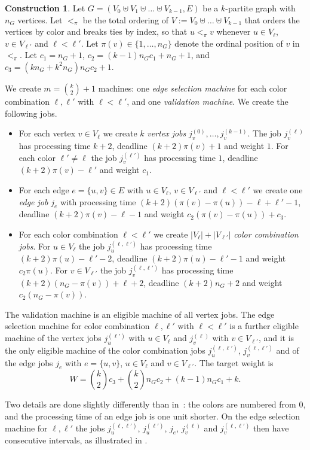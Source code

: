 \documentclass[11pt,a4paper]{article}
\theoremstyle{definition}
\newtheorem{construction}{Construction}
\begin{document}
\begin{construction}\label{const:w1hard}
Let $G=(V_0\uplus V_1\uplus\ldots\uplus V_{k-1},E)$ be a $k$-partite graph with $n_G$
vertices. Let $<_\pi$ be the total ordering of $V:=V_0\uplus\ldots\uplus V_{k-1}$ that
orders the vertices by color and breaks ties by index, so that $u<_\pi v$ whenever
$u\in V_\ell$, $v\in V_{\ell'}$ and $\ell<\ell'$. Let $\pi(v)\in\{1,\ldots,n_G\}$ denote the
ordinal position of $v$ in $<_\pi$. Let $c_1=n_G+1$, $c_2=(k-1)n_Gc_1+n_G+1$, and
$c_3=(kn_G+k^2n_G)n_Gc_2+1$.

We create $m=\binom{k}{2}+1$ machines: one \emph{edge selection machine} for each color
combination $\ell,\ell'$ with $\ell<\ell'$, and one \emph{validation machine}. We create
the following jobs.
\begin{itemize}
\item For each vertex $v\in V_\ell$ we create $k$ \emph{vertex jobs} $j_v^{(0)},\ldots,j_v^{(k-1)}$.
  The job $j_v^{(\ell)}$ has processing time $k+2$, deadline $(k+2)\pi(v)+1$ and weight $1$.
  For each color $\ell'\neq\ell$ the job $j_v^{(\ell')}$ has processing time $1$, deadline
  $(k+2)\pi(v)-\ell'$ and weight $c_1$.
\item For each edge $e=\{u,v\}\in E$ with $u\in V_\ell$, $v\in V_{\ell'}$ and $\ell<\ell'$ we
  create one \emph{edge job} $j_e$ with processing time $(k+2)(\pi(v)-\pi(u))-\ell+\ell'-1$,
  deadline $(k+2)\pi(v)-\ell-1$ and weight $c_2(\pi(v)-\pi(u))+c_3$.
\item For each color combination $\ell<\ell'$ we create $|V_\ell|+|V_{\ell'}|$ \emph{color
  combination jobs}. For $u\in V_\ell$ the job $j_u^{(\ell,\ell')}$ has processing time
  $(k+2)\pi(u)-\ell'-2$, deadline $(k+2)\pi(u)-\ell'-1$ and weight $c_2\pi(u)$. For
  $v\in V_{\ell'}$ the job $j_v^{(\ell,\ell')}$ has processing time
  $(k+2)(n_G-\pi(v))+\ell+2$, deadline $(k+2)n_G+2$ and weight $c_2(n_G-\pi(v))$.
\end{itemize}
The validation machine is an eligible machine of all vertex jobs. The edge selection
machine for color combination $\ell,\ell'$ with $\ell<\ell'$ is a further eligible machine
of the vertex jobs $j_u^{(\ell')}$ with $u\in V_\ell$ and $j_v^{(\ell)}$ with
$v\in V_{\ell'}$, and it is the only eligible machine of the color combination jobs
$j_u^{(\ell,\ell')}$, $j_v^{(\ell,\ell')}$ and of the edge jobs $j_e$ with $e=\{u,v\}$,
$u\in V_\ell$ and $v\in V_{\ell'}$. The target weight is
\[
W=\binom{k}{2}c_3+\binom{k}{2}n_Gc_2+(k-1)n_Gc_1+k.
\]
\end{construction}
Two details are done slightly differently than in~\cite{HIMS24}: the colors are numbered
from $0$, and the processing time of an edge job is one unit shorter. On the edge
selection machine for $\ell,\ell'$ the jobs $j_u^{(\ell,\ell')}$, $j_u^{(\ell')}$, $j_e$,
$j_v^{(\ell)}$ and $j_v^{(\ell,\ell')}$ then have consecutive intervals, as illustrated in
.
\end{document}
